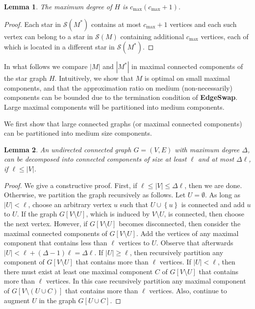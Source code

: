 \documentclass[11pt]{article}
\newtheorem{lemma}{Lemma}
\newcommand{\set}[1]{\left\{ #1 \right\}}
\newcommand{\abs}[1]{\left| #1 \right|}
\newcommand{\cmax}{c_{\max}}
\newcommand{\calS}{\mathcal{S}}
\begin{document}
\begin{lemma}
The maximum degree of $H$ is $\cmax(\cmax+1)$.
\end{lemma}
\begin{proof}
Each star in $\calS(M^*)$ contains at most $\cmax+1$ vertices and each
such vertex can belong to a star in $\calS(M)$ containing additional
$\cmax$ vertices, each of which is located in a different star in
$\calS(M^*)$.
\end{proof}

In what follows we compare $\abs{M}$ and $\abs{M^*}$ in maximal
connected components of the star graph $H$.  Intuitively, we show that
$M$ is optimal on small maximal components, and that the approximation
ratio on medium (non-necessarily) components can be bounded due to the
termination condition of \textbf{EdgeSwap}.  Large maximal components
will be partitioned into medium components.

We first show that large connected graphs (or maximal connected
components) can be partitioned into medium size components.

\begin{lemma}
\label{lemma:dec}
An undirected connected graph $G = (V,E)$ with maximum degree
$\Delta$, can be decomposed into connected components of size at least
$\ell$ and at most $\Delta \ell$, if $\ell \leq \abs{V}$.
\end{lemma}
\begin{proof}%
We give a constructive proof.
%
First, if $\ell \leq |V| \leq \Delta \ell$, then we are done.
%
Otherwise, we partition the graph recursively as follows.  Let $U
= \emptyset$.  As long as $\abs{U} < \ell$, choose an arbitrary vertex
$u$ such that $U \cup \set{u}$ is connected and add $u$ to $U$.
%
If the graph $G[V \setminus U]$, which is induced by $V \setminus U$,
is connected, then choose the next vertex.
%
However, if $G[V \setminus U]$ becomes disconnected, then consider the
maximal connected components of $G[V \setminus U]$.  Add the vertices
of any maximal component that contains less than $\ell$ vertices to
$U$.  Observe that afterwards $\abs{U} < \ell + (\Delta-1) \ell
= \Delta \ell$.
%
If $\abs{U} \geq \ell$, then recursively partition any component of
$G[V \setminus U]$ that contains more than $\ell$ vertices.
%
If $\abs{U} < \ell$, then there must exist at least one maximal
component $C$ of $G[V \setminus U]$ that contains more than $\ell$
vertices.  In this case recursively partition any maximal component of
$G[V \setminus (U \cup C)]$ that contains more than $\ell$ vertices.
Also, continue to augment $U$ in the graph $G[U \cup C]$.
\end{proof}
\end{document}
